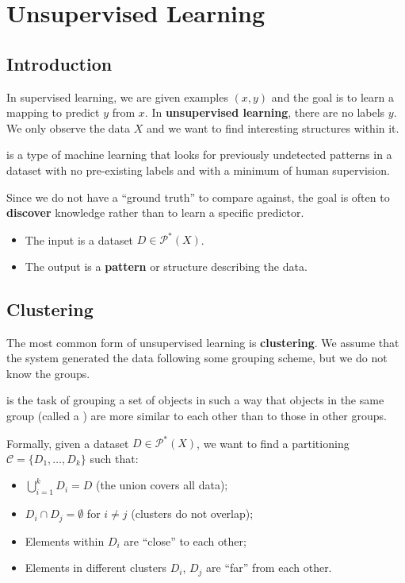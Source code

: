 \chapter{Unsupervised Learning}

\section{Introduction}

In supervised learning, we are given examples $(x, y)$ and the goal is to learn a mapping to predict $y$ from $x$. In \textbf{unsupervised learning}, there are no labels $y$. We only observe the data $X$ and we want to find interesting structures within it.

\begin{definitionblock}
 is a type of machine learning that looks for previously undetected patterns in a dataset with no pre-existing labels and with a minimum of human supervision.
\end{definitionblock}

Since we do not have a ``ground truth'' to compare against, the goal is often to \textbf{discover} knowledge rather than to learn a specific predictor.
\begin{itemize}
    \item The input is a dataset $D \in \mathcal{P}^*(X)$.
    \item The output is a \textbf{pattern} or structure describing the data.
\end{itemize}

\section{Clustering}

The most common form of unsupervised learning is \textbf{clustering}. We assume that the system generated the data following some grouping scheme, but we do not know the groups.

\begin{definitionblock}[Clustering]
 is the task of grouping a set of objects in such a way that objects in the same group (called a ) are more similar to each other than to those in other groups.
\end{definitionblock}

Formally, given a dataset $D \in \mathcal{P}^*(X)$, we want to find a partitioning $\mathcal{C} = \{D_1, \dots, D_k\}$ such that:
\begin{itemize}
    \item $\bigcup_{i=1}^k D_i = D$ (the union covers all data);
    \item $D_i \cap D_j = \emptyset$ for $i \neq j$ (clusters do not overlap);
    \item Elements within $D_i$ are ``close'' to each other;
    \item Elements in different clusters $D_i$, $D_j$ are ``far'' from each other.
\end{itemize}

